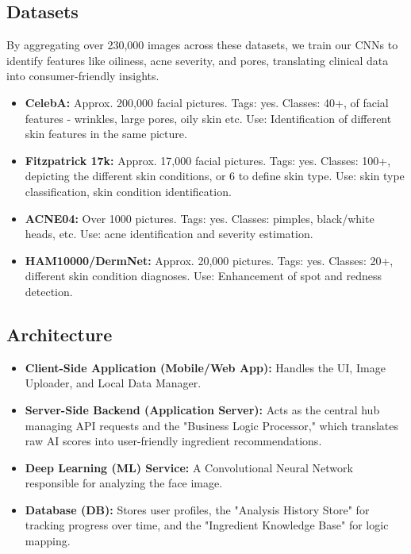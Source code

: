 \documentclass[12pt,a4paper]{article}
\begin{document}
\subsection{Datasets}
By aggregating over 230,000 images across these datasets, we train our CNNs to identify features like oiliness, acne severity, and pores, translating clinical data into consumer-friendly insights.
\begin{itemize}
    \item \textbf{CelebA:} Approx. 200,000 facial pictures. Tags: yes. Classes: 40+, of facial features - wrinkles, large pores, oily skin etc. Use: Identification of different skin features in the same picture.
    \item \textbf{Fitzpatrick 17k:} Approx. 17,000 facial pictures. Tags: yes. Classes: 100+, depicting the different skin conditions, or 6 to define skin type. Use: skin type classification, skin condition identification.
    \item \textbf{ACNE04:} Over 1000 pictures. Tags: yes. Classes: pimples, black/white heads, etc. Use: acne identification and severity estimation.
    \item \textbf{HAM10000/DermNet:} Approx. 20,000 pictures. Tags: yes. Classes: 20+, different skin condition diagnoses. Use: Enhancement of spot and redness detection.
\end{itemize}

\subsection{Architecture}
\begin{itemize}
    \item \textbf{Client-Side Application (Mobile/Web App):} Handles the UI, Image Uploader, and Local Data Manager.
    \item \textbf{Server-Side Backend (Application Server):} Acts as the central hub managing API requests and the "Business Logic Processor," which translates raw AI scores into user-friendly ingredient recommendations.
    \item \textbf{Deep Learning (ML) Service:} A Convolutional Neural Network responsible for analyzing the face image.
    \item \textbf{Database (DB):} Stores user profiles, the "Analysis History Store" for tracking progress over time, and the "Ingredient Knowledge Base" for logic mapping.
\end{itemize}
\end{document}
